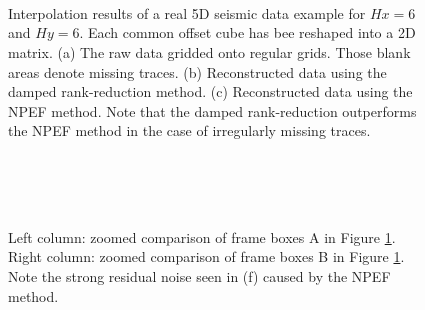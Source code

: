 {%

\begin{figure}[htb!]
    \centering
    \\
    \\
    \\
	\caption{Interpolation results of a real 5D seismic data example for $Hx=6$ and $Hy=6$. Each common offset cube has bee reshaped into a 2D matrix. (a) The raw data gridded onto regular grids. Those blank areas denote missing traces. (b) Reconstructed data using the damped rank-reduction method. (c) Reconstructed data using the NPEF method. Note that the damped rank-reduction outperforms the NPEF method in the case of irregularly missing traces.}
	\label{fig:r_obs5d,r_drr5d,r_npef5d}
\end{figure}

\begin{figure}[htb!]
    \centering
    \\
    \\
    \\
	\caption{Left column: zoomed comparison of frame boxes A in Figure \ref{fig:r_obs5d,r_drr5d,r_npef5d}. Right column: zoomed comparison of frame boxes B in Figure \ref{fig:r_obs5d,r_drr5d,r_npef5d}. Note the strong residual noise seen in (f) caused by the NPEF method. }
	\label{fig:r_obs5d1a,r_obs5d1b,r_drr5d1a,r_drr5d1b,r_npef5d1a,r_npef5d1b}
\end{figure}




}
